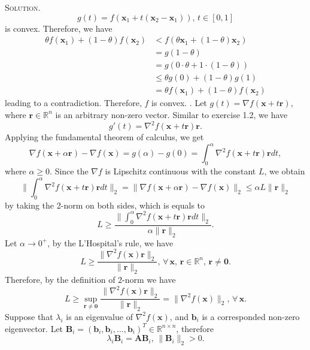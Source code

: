 \documentclass[12pt, a4paper, oneside]{ctexart}
\newenvironment{solution}{\par\noindent\textsc{Solution. }}{\\\par}
\begin{document}
\begin{solution}
    \[
    g(t) = f(\mathbf{x}_1 + t (\mathbf{x}_2 - \mathbf{x}_1)),\, t \in [0, 1]
    \]
    is convex. Therefore, we have 
    \begin{align*}
    	\theta f(\mathbf{x}_1) + (1 - \theta) f(\mathbf{x}_2) & < f(\theta \mathbf{x}_1 + (1 - \theta) \mathbf{x}_2) \\
    	& = g(1 - \theta) \\
    	& = g(0 \cdot \theta + 1 \cdot (1 - \theta)) \\
    	& \leq \theta g(0) + (1 - \theta) g(1) \\
    	& = \theta f(\mathbf{x}_1) + (1 - \theta) f(\mathbf{x}_2)
    \end{align*}
    leading to a contradiction. Therefore, $f$ is convex.
    \newline{}. Let $g(t) = \nabla f(\mathbf{x} + t \mathbf{r})$, where $\mathbf{r} \in \mathbb{R}^n$ is an arbitrary non-zero vector. Similar to exercise 1.2, we have
    \[
    g'(t) = \nabla^2 f(\mathbf{x} + t \mathbf{r}) \mathbf{r}.
    \]
    Applying the fundamental theorem of calculus, we get
    \[
    \nabla f(\mathbf{x} + \alpha \mathbf{r}) - \nabla f(\mathbf{x}) = g(\alpha) - g(0) = \int_{0}^{\alpha} \nabla^2 f(\mathbf{x} + t \mathbf{r}) \mathbf{r} dt,
    \]
    where $\alpha \geq 0$. Since the $\nabla f$ is Lipschitz continuous with the constant $L$, we obtain
    \[
    \|\int_{0}^{\alpha} \nabla^2 f(\mathbf{x} + t \mathbf{r}) \mathbf{r} dt\|_2 = \|\nabla f(\mathbf{x} + \alpha \mathbf{r}) - \nabla f(\mathbf{x})\|_2 \leq \alpha L \|\mathbf{r}\|_2 
    \]
    by taking the 2-norm on both sides, which is equals to
    \[
    L \geq \frac{\|\int_{0}^{\alpha} \nabla^2 f(\mathbf{x} + t \mathbf{r}) \mathbf{r} dt\|_2}{\alpha \|\mathbf{r}\|_2}.
    \]
    Let $\alpha \to 0^+$, by the L'Hospital's rule, we have
    \[
    L \geq \frac{\|\nabla^2 f(\mathbf{x}) \mathbf{r}\|_2}{\|\mathbf{r}\|_2},\, \forall\, \mathbf{x},\, \mathbf{r} \in \mathbb{R}^n,\, \mathbf{r} \neq \mathbf{0}.
    \]
   Therefore, by the definition of 2-norm we have
    \[
    L \geq \sup\limits_{\mathbf{r} \neq \mathbf{0}} \frac{\|\nabla^2 f(\mathbf{x}) \mathbf{r}\|_2}{\|\mathbf{r}\|_2} = \|\nabla^2 f(\mathbf{x})\|_2,\, \forall\, \mathbf{x}.
    \]
    Suppose that $\lambda_i$ is an eigenvalue of $\nabla^2 f(\mathbf{x})$, and $\mathbf{b}_i$ is a corresponded non-zero eigenvector. Let $\mathbf{B}_i = (\mathbf{b}_i, \mathbf{b}_i, \dots, \mathbf{b}_i)^T \in \mathbb{R}^{n \times n}$, therefore
    \[
    \lambda_i \mathbf{B}_i = \mathbf{AB}_i,\, \|\mathbf{B}_i\|_2 > 0.
\]
\end{solution}
\end{document}

